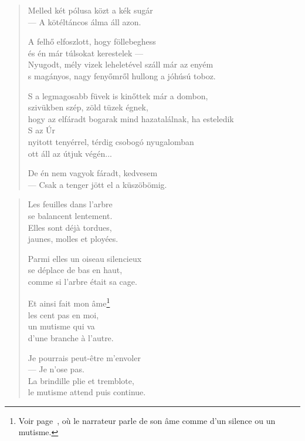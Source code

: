 \documentclass[11pt]{book}
\newcommand*{\centeredornament}{\centerline{\pgfornament[width=6cm]{88}}}
\begin{document}
\newpage

\vspace*{-15mm}
\centeredornament



\begin{verse}
  Melled két pólusa közt a kék sugár \\
  --- A kötéltáncos álma áll azon.

  A felhő elfoszlott, hogy föllebeghess \\
  és én már túlsokat kerestelek --- \\
  Nyugodt, mély vizek leheletével száll már az enyém \\
  s magányos, nagy fenyőmről hullong a jóhúsú toboz.

  S a legmagosabb füvek is kinőttek már a dombon, \\
  szivükben szép, zöld tüzek égnek, \\
  hogy az elfáradt bogarak mind hazatalálnak, ha esteledik \\
  S az Úr \\
  nyitott tenyérrel, térdig csobogó nyugalomban \\
  ott áll az útjuk végén...

  De én nem vagyok fáradt, kedvesem \\
  --- Csak a tenger jött el a küszöbömig.
\end{verse}

\newpage

\vspace*{-15mm}
\centeredornament


\label{les_feuilles_dans_l_arbre}

\begin{verse}
  Les feuilles dans l'arbre \\
  se balancent lentement. \\
  Elles sont déjà tordues, \\
  jaunes, molles et ployées.

  Parmi elles un oiseau silencieux \\
  se déplace de bas en haut, \\
  comme si l'arbre était sa cage.

  Et ainsi fait mon âme\footnote{Voir
  page~\pageref{seul_toi_devrait_lire_mes_poemes}, où le narrateur
  parle de son âme comme d'un silence ou un mutisme.} \\
  les cent pas en moi, \\
  un mutisme qui va \\
  d'une branche à l'autre.

  Je pourrais peut-être m'envoler \\
  --- Je n'ose pas. \\
  La brindille plie et tremblote, \\
  le mutisme attend puis continue.
\end{verse}
\end{document}
